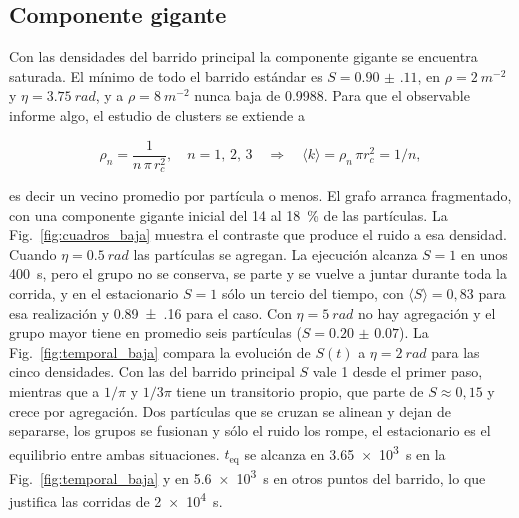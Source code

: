 \documentclass[10pt,a4paper]{article}
\newcommand{\teq}{\ensuremath{t_{\mathrm{eq}}}}
\begin{document}
\subsection{Componente gigante}
\label{sec:S}

Con las densidades del barrido principal la componente gigante se encuentra saturada.
El mínimo de todo el barrido estándar es $S = \num{0.90(11)}$, en $\rho = \SI{2}{m^{-2}}$ y $\eta = \SI{3.75}{rad}$, y a $\rho = \SI{8}{m^{-2}}$ nunca baja de \num{0.9988}.
Para que el observable informe algo, el estudio de clusters se extiende a

\begin{equation}
    \rho_n = \frac{1}{n\,\pi\,r_c^2}, \quad n = 1,\,2,\,3
    \quad \Longrightarrow \quad
    \langle k \rangle = \rho_n\,\pi r_c^2 = 1/n,
    \label{eq:densidades_bajas}
\end{equation}

es decir un vecino promedio por partícula o menos. El grafo arranca fragmentado, con una componente gigante inicial del 14 al \SI{18}{\percent} de las partículas. La Fig.~\ref{fig:cuadros_baja} muestra el contraste que produce el ruido a esa densidad.
Cuando $\eta = \SI{0.5}{rad}$ las partículas se agregan. La ejecución alcanza $S = 1$ en unos \SI{400}{s}, pero el grupo no se conserva, se parte y se vuelve a juntar durante toda la corrida, y en el estacionario $S = 1$ sólo un tercio del tiempo, con $\langle S \rangle = 0{,}83$ para esa realización y \num{0.89(16)} para el caso.
Con $\eta = \SI{5}{rad}$ no hay agregación y el grupo mayor tiene en promedio seis partículas ($S = \num{0.20(7)}$). La Fig.~\ref{fig:temporal_baja} compara la evolución de $S(t)$ a $\eta = \SI{2}{rad}$ para las cinco densidades.
Con las del barrido principal $S$ vale 1 desde el primer paso, mientras que a $1/\pi$ y $1/3\pi$ tiene un transitorio propio, que parte de $S \approx 0{,}15$ y crece por agregación.
Dos partículas que se cruzan se alinean y dejan de separarse, los grupos se fusionan y sólo el ruido los rompe, el estacionario es el equilibrio entre ambas situaciones.
\teq{} se alcanza en \SI{3.65e3}{s} en la Fig.~\ref{fig:temporal_baja} y en \SI{5.6e3}{s} en
otros puntos del barrido, lo que justifica las corridas de \SI{2e4}{s}.
\end{document}
